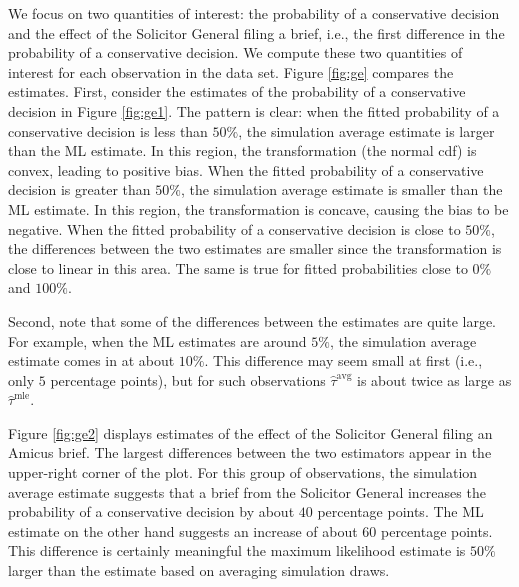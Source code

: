 \documentclass[11pt]{article}
\begin{document}
We focus on two quantities of interest: the probability of a conservative decision and the effect of the Solicitor General filing a brief, i.e., the first difference in the probability of a conservative decision. We compute these two quantities of interest for each observation in the data set. Figure \ref{fig:ge} compares the estimates. First, consider the estimates of the probability of a conservative decision in  Figure \ref{fig:ge1}. The pattern is clear: when the fitted probability of a conservative decision is less than $50\%$, the simulation average estimate is larger than the ML estimate. In this region, the transformation (the normal cdf) is convex, leading to positive bias.
When the fitted probability of a conservative decision is greater than $50\%$, the simulation average estimate is smaller than the ML estimate. In this region, the transformation is concave, causing the bias to be negative. When the fitted probability of a conservative decision is close to $50\%$, the differences between the two estimates are smaller since the transformation is close to linear in this area. The same is true for fitted probabilities close to $0\%$ and $100\%$.


Second, note that some of the differences between the estimates are quite large.
For example, when the ML estimates are around $5\%$, the simulation average estimate comes in at about $10\%$. This difference may seem small at first (i.e., only $5$ percentage points), but for such observations $\hat{\tau}^\text{avg}$ is about twice as large as $\hat{\tau}^\text{mle}$.

Figure \ref{fig:ge2} displays estimates of the effect of the Solicitor General filing an Amicus brief. The largest differences between the two estimators appear in the upper-right corner of the plot. For this group of observations, the simulation average estimate suggests that a brief from the Solicitor General increases the probability of a conservative decision by about $40$ percentage points. The ML estimate on the other hand suggests an increase of about $60$ percentage points.
This difference is certainly meaningful \textemdash{} the maximum likelihood estimate is $50\%$ larger than the estimate based on averaging simulation draws.


\end{document}
